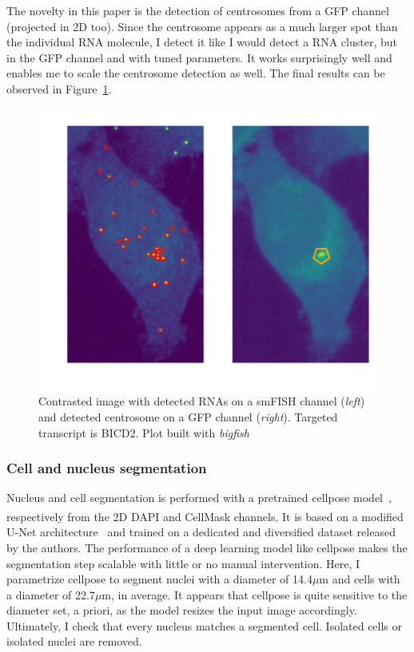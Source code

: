 The novelty in this paper is the detection of centrosomes from a \ac{GFP} channel (projected in 2D too).
Since the centrosome appears as a much larger spot than the individual \ac{RNA} molecule, I detect it like I would detect a \ac{RNA} cluster, but in the \ac{GFP} channel and with tuned parameters.
It works surprisingly well and enables me to scale the centrosome detection as well.
The final results can be observed in Figure~\ref{fig:centrosomes}.

\begin{figure}[]
    \centering
    \includegraphics[width=\textwidth]{figures/chapter5/centrosomes}
    \caption[RNA and centrosome detection results]{Contrasted image with detected RNAs on a smFISH channel (\textit{left}) and detected centrosome on a GFP channel (\textit{right}).
	Targeted transcript is BICD2.
	Plot built with \emph{bigfish}}
    \label{fig:centrosomes}
\end{figure}

\subsubsection{Cell and nucleus segmentation}

Nucleus and cell segmentation is performed with a pretrained cellpose model~\cite{stringer_cellpose_2021}, respectively from the 2D DAPI and CellMask\textsuperscript{\texttrademark} channels.
It is based on a modified U-Net architecture~\cite{Ronneberger_unet} and trained on a dedicated and diversified dataset released by the authors.
The performance of a deep learning model like cellpose makes the segmentation step scalable with little or no manual intervention.
Here, I parametrize cellpose to segment nuclei with a diameter of 14.4$\mu$m and cells with a diameter of 22.7$\mu$m, in average.
It appears that cellpose is quite sensitive to the diameter set, a priori, as the model resizes the input image accordingly.
Ultimately, I check that every nucleus matches a segmented cell.
Isolated cells or isolated nuclei are removed.

